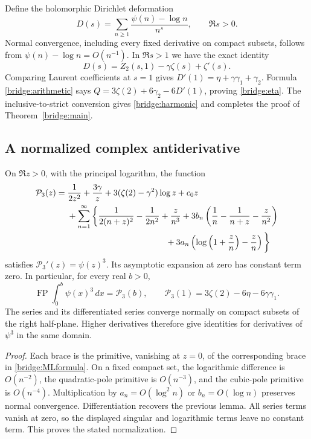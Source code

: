 Define the holomorphic Dirichlet deformation
\[
 D(s)=\sum_{n\ge1}\frac{\psi(n)-\log n}{n^s},\qquad\Re s>0.
\]
Normal convergence, including every fixed derivative on compact
subsets, follows from $\psi(n)-\log n=O(n^{-1})$.
In $\Re s>1$ we have the exact identity
\[
 D(s)=Z_2(s,1)-\gamma\zeta(s)+\zeta'(s).
\]
Comparing Laurent coefficients at $s=1$ gives
$D'(1)=\eta+\gamma\gamma_1+\gamma_2$.  Formula
\eqref{bridge:arithmetic} says
$Q=3\zeta(2)+6\gamma_2-6D'(1)$, proving
\eqref{bridge:eta}.  The inclusive-to-strict conversion gives
\eqref{bridge:harmonic} and completes the proof of
Theorem~\ref{bridge:main}.

\subsection{A normalized complex antiderivative}

\begin{corollary}\label{bridge:primitive}
On $\Re z>0$, with the principal logarithm, the function
\begin{align}
 \mathcal P_3(z)={}&\frac1{2z^2}+\frac{3\gamma}z
       +3(\zeta(2)-\gamma^2)\log z+c_0z\notag\\
 &+\sum_{n=1}^{\infty}\bigg\{
      \frac1{2(n+z)^2}-\frac1{2n^2}+\frac{z}{n^3}
      +3b_n\left(\frac1n-\frac1{n+z}-\frac z{n^2}\right)
        \notag\\
 &\hspace{41mm}
      +3a_n\left(\log\left(1+\frac zn\right)-\frac zn\right)
        \bigg\}
 \label{bridge:primitiveformula}
\end{align}
satisfies $\mathcal P_3'(z)=\psi(z)^3$.  Its asymptotic expansion at
zero has constant term zero.  In particular, for every real $b>0$,
\[
 \operatorname{FP}\int_0^b\psi(x)^3\,dx=\mathcal P_3(b),
 \qquad \mathcal P_3(1)=3\zeta(2)-6\eta-6\gamma\gamma_1.
\]
The series and its differentiated series converge normally on compact
subsets of the right half-plane.  Higher derivatives therefore give
identities for derivatives of $\psi^3$ in the same domain.
\end{corollary}

\begin{proof}
Each brace is the primitive, vanishing at $z=0$, of the corresponding
brace in \eqref{bridge:MLformula}.  On a fixed compact set,
the logarithmic difference is $O(n^{-2})$, the quadratic-pole
primitive is $O(n^{-3})$, and the cubic-pole primitive is $O(n^{-4})$.
Multiplication by $a_n=O(\log^2 n)$ or $b_n=O(\log n)$ preserves
normal convergence.  Differentiation recovers the previous lemma.
All series terms vanish at zero, so the displayed singular and logarithmic
terms leave no constant term.  This proves the stated normalization.
\end{proof}

